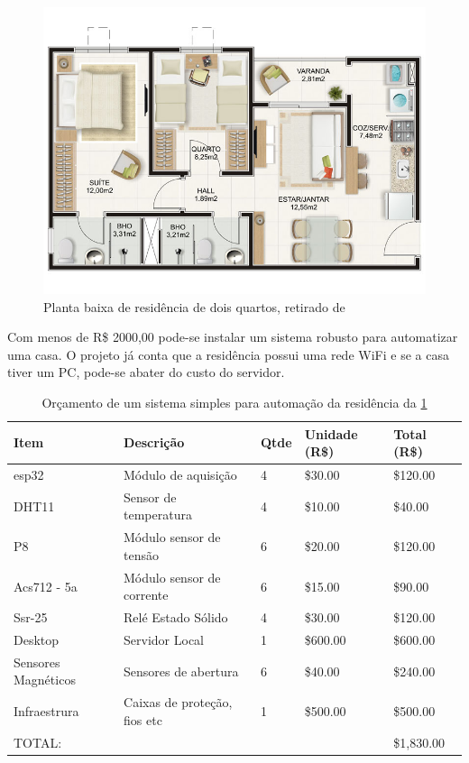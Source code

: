 \begin{figure}[h!]
\centering
\includegraphics[width=13cm]{./02_Capitulos/02_Cap5/figures/planta-casa}
\caption{Planta baixa de residência de dois quartos, retirado de \cite{decorandocasas}}
\label{fig:5.1.0/planta-casa}
\end{figure}

Com menos de R\$ 2000,00 pode-se instalar um sistema robusto para automatizar uma casa. O projeto já conta que a residência possui uma rede WiFi e se a casa tiver um PC, pode-se abater do custo do servidor.


\begin{table}[h!]
\centering
\caption{Orçamento de um sistema simples para automação da residência da \ref{fig:5.1.0/planta-casa}}
\begin{tabular}{|l|l|l|l|l|}
\hline
Item                & Descrição                    & Qtde & Unidade (R\$) & Total (R\$) \\ \hline
esp32               & Módulo de aquisição          & 4    & \$30.00       & \$120.00    \\ \hline
DHT11               & Sensor de temperatura        & 4    & \$10.00       & \$40.00     \\ \hline
P8                  & Módulo sensor de tensão      & 6    & \$20.00       & \$120.00    \\ \hline
Acs712 - 5a         & Módulo sensor de corrente    & 6    & \$15.00       & \$90.00     \\ \hline
Ssr-25              & Relé Estado Sólido           & 4    & \$30.00       & \$120.00    \\ \hline
Desktop             & Servidor Local               & 1    & \$600.00      & \$600.00    \\ \hline
Sensores Magnéticos & Sensores de abertura         & 6    & \$40.00       & \$240.00    \\ \hline
Infraestrura        & Caixas de proteção, fios etc & 1    & \$500.00      & \$500.00    \\ \hline
\multicolumn{4}{|l|}{TOTAL:}                                              & \$1,830.00  \\ \hline
\end{tabular}
\label{table:planta-casa}
\end{table}

